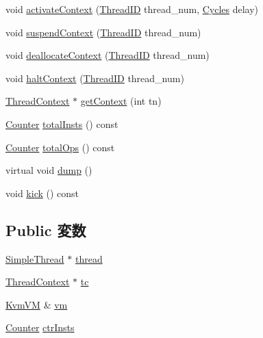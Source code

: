 \begin{DoxyCompactItemize}
\item 
void \hyperlink{classBaseKvmCPU_ad7a501b28bdbe8b3e708cd1ef69ac191}{activateContext} (\hyperlink{base_2types_8hh_ab39b1a4f9dad884694c7a74ed69e6a6b}{ThreadID} thread\_\-num, \hyperlink{classCycles}{Cycles} delay)
\item 
void \hyperlink{classBaseKvmCPU_a1dad4c4d2c3df4ef367e14fcc973ce74}{suspendContext} (\hyperlink{base_2types_8hh_ab39b1a4f9dad884694c7a74ed69e6a6b}{ThreadID} thread\_\-num)
\item 
void \hyperlink{classBaseKvmCPU_a49259982c98a7959f39b77db5069fea0}{deallocateContext} (\hyperlink{base_2types_8hh_ab39b1a4f9dad884694c7a74ed69e6a6b}{ThreadID} thread\_\-num)
\item 
void \hyperlink{classBaseKvmCPU_ab39525f324a8a93139e17327f6ccde10}{haltContext} (\hyperlink{base_2types_8hh_ab39b1a4f9dad884694c7a74ed69e6a6b}{ThreadID} thread\_\-num)
\item 
\hyperlink{classThreadContext}{ThreadContext} $\ast$ \hyperlink{classBaseKvmCPU_a2199ea70043ddde97c86e49a656b7ba9}{getContext} (int tn)
\item 
\hyperlink{base_2types_8hh_ae1475755791765b8e6f6a8bb091e273e}{Counter} \hyperlink{classBaseKvmCPU_a7e01d94bb5a6e15fa8c94bcdf276115d}{totalInsts} () const 
\item 
\hyperlink{base_2types_8hh_ae1475755791765b8e6f6a8bb091e273e}{Counter} \hyperlink{classBaseKvmCPU_a76fa5df6827aaa8fc26deebad97d9e78}{totalOps} () const 
\item 
virtual void \hyperlink{classBaseKvmCPU_accd2600060dbaee3a3b41aed4034c63c}{dump} ()
\item 
void \hyperlink{classBaseKvmCPU_ae984a01dc23c52800f5fe28344f59b81}{kick} () const 
\end{DoxyCompactItemize}
\subsection*{Public 変数}
\begin{DoxyCompactItemize}
\item 
\hyperlink{classSimpleThread}{SimpleThread} $\ast$ \hyperlink{classBaseKvmCPU_af9572fa907cd21b54cb14bd626010d39}{thread}
\item 
\hyperlink{classThreadContext}{ThreadContext} $\ast$ \hyperlink{classBaseKvmCPU_a4455a4759e69e5ebe68ae7298cbcc37d}{tc}
\item 
\hyperlink{classKvmVM}{KvmVM} \& \hyperlink{classBaseKvmCPU_a6b8ecd9ec419f0cbe3c1047be643fe08}{vm}
\item 
\hyperlink{base_2types_8hh_ae1475755791765b8e6f6a8bb091e273e}{Counter} \hyperlink{classBaseKvmCPU_a4a8e80967bf91692eb1703752a8203b3}{ctrInsts}
\end{DoxyCompactItemize}
